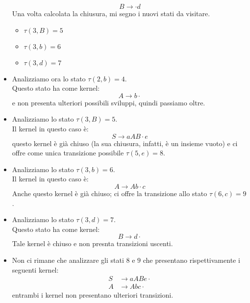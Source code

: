 \documentclass[class=book, crop=false, oneside, 12pt]{standalone}
\begin{document}
\begin{itemize}
    \begin{equation*}
        B \to \cdot d
    \end{equation*}
    Una volta calcolata la chiusura, mi segno i nuovi stati da visitare.
    \begin{itemize}
        \item \(\tau (3, B) = 5\)
        \item \(\tau (3, b) = 6\)
        \item \(\tau (3, d) = 7\)
    \end{itemize}
    \item Analizziamo ora lo stato \(\tau (2, b) = 4\). \\
    Questo stato ha come kernel:
    \begin{equation*}
        A \to b \cdot
    \end{equation*}
    e non presenta ulteriori possibili sviluppi, quindi passiamo oltre.
    \item Analizziamo lo stato \(\tau (3, B) = 5\). \\
    Il kernel in questo caso è:
    \begin{equation*}
        S \to aAB \cdot e
    \end{equation*}
    questo kernel è già chiuso (la sua chiusura, infatti, è un insieme vuoto) e ci offre come unica transizione possibile \(\tau (5, e) = 8\).
    \item Analizziamo lo stato \(\tau (3, b) = 6\). \\
    Il kernel in questo caso è:
    \begin{equation*}
        A \to Ab \cdot c
    \end{equation*}
    Anche questo kernel è già chiuso; ci offre la transizione allo stato \(\tau (6, c) = 9\).
    \item Analizziamo lo stato \(\tau (3, d) = 7\). \\
    Questo stato ha come kernel:
    \begin{equation*}
        B \to d \cdot 
    \end{equation*}
    Tale kernel è chiuso e non presnta transizioni uscenti.
    \item Non ci rimane che analizzare gli stati \(8\) e \(9\) che presentano rispettivamente i seguenti kernel:
    \begin{align*}
        S &\to aABe \cdot \\
        A &\to Abc \cdot
    \end{align*}
    entrambi i kernel non presentano ulteriori transizioni.
\end{itemize}
\end{document}
